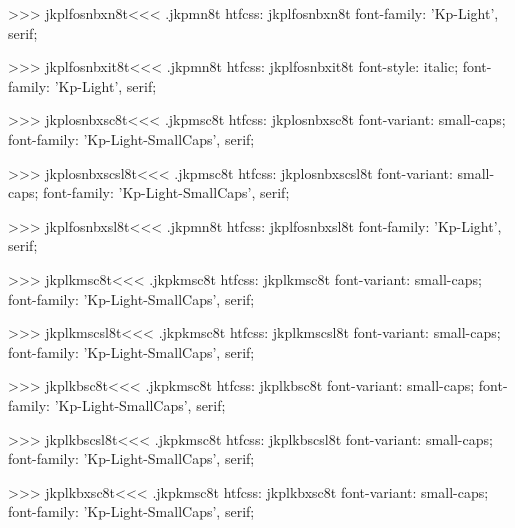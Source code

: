 >>>
\<jkplfosnbxn8t\><<<
.jkpmn8t
htfcss:  jkplfosnbxn8t  font-family: 'Kp-Light', serif;

>>>
\<jkplfosnbxit8t\><<<
.jkpmn8t
htfcss:  jkplfosnbxit8t  font-style: italic; font-family: 'Kp-Light', serif;

>>>
\<jkplosnbxsc8t\><<<
.jkpmsc8t
htfcss:  jkplosnbxsc8t  font-variant: small-caps; font-family: 'Kp-Light-SmallCaps', serif;

>>>
\<jkplosnbxscsl8t\><<<
.jkpmsc8t
htfcss:  jkplosnbxscsl8t  font-variant: small-caps; font-family: 'Kp-Light-SmallCaps', serif;

>>>
\<jkplfosnbxsl8t\><<<
.jkpmn8t
htfcss:  jkplfosnbxsl8t  font-family: 'Kp-Light', serif;

>>>
\<jkplkmsc8t\><<<
.jkpkmsc8t
htfcss:  jkplkmsc8t  font-variant: small-caps; font-family: 'Kp-Light-SmallCaps', serif;

>>>
\<jkplkmscsl8t\><<<
.jkpkmsc8t
htfcss:  jkplkmscsl8t  font-variant: small-caps; font-family: 'Kp-Light-SmallCaps', serif;

>>>
\<jkplkbsc8t\><<<
.jkpkmsc8t
htfcss:  jkplkbsc8t  font-variant: small-caps; font-family: 'Kp-Light-SmallCaps', serif;

>>>
\<jkplkbscsl8t\><<<
.jkpkmsc8t
htfcss:  jkplkbscsl8t  font-variant: small-caps; font-family: 'Kp-Light-SmallCaps', serif;

>>>
\<jkplkbxsc8t\><<<
.jkpkmsc8t
htfcss:  jkplkbxsc8t  font-variant: small-caps; font-family: 'Kp-Light-SmallCaps', serif;

